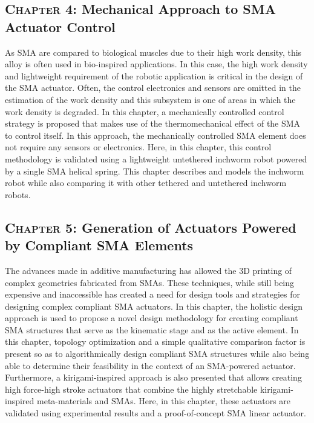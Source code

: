 \subsection*{\textsc{Chapter 4}: Mechanical Approach to SMA Actuator Control}
As SMA are compared to biological muscles due to their high work density, this alloy is often used in bio-inspired applications. In this case, the high work density and lightweight requirement of the robotic application is critical in the design of the SMA actuator. Often, the control electronics and sensors are omitted in the estimation of the work density and this subsystem is one of areas in which the work density is degraded. In this chapter, a mechanically controlled control strategy is proposed that makes use of the thermomechanical effect of the SMA to control itself. In this approach, the mechanically controlled SMA element does not require any sensors or electronics. Here, in this chapter, this control methodology is validated using a lightweight untethered inchworm robot powered by a single SMA helical spring. This chapter describes and models the inchworm robot while also comparing it with other tethered and untethered inchworm robots.

\subsection*{\textsc{Chapter 5}: Generation of Actuators Powered by Compliant SMA Elements}
The advances made in additive manufacturing has allowed the 3D printing of complex geometries fabricated from SMAs. These techniques, while still being expensive and inaccessible has created a need for design tools and strategies for designing complex compliant SMA actuators. In this chapter, the holistic design approach is used to propose a novel design methodology for creating compliant SMA structures that serve as the kinematic stage and as the active element. In this chapter, topology optimization and a simple qualitative comparison factor is present so as to algorithmically design compliant SMA structures while also being able to determine their feasibility in the context of an SMA-powered actuator. Furthermore, a kirigami-inspired approach is also presented that allows creating high force-high stroke actuators that combine the highly stretchable kirigami-inspired meta-materials and SMAs. Here, in this chapter, these actuators are validated using experimental results and a proof-of-concept SMA linear actuator.

